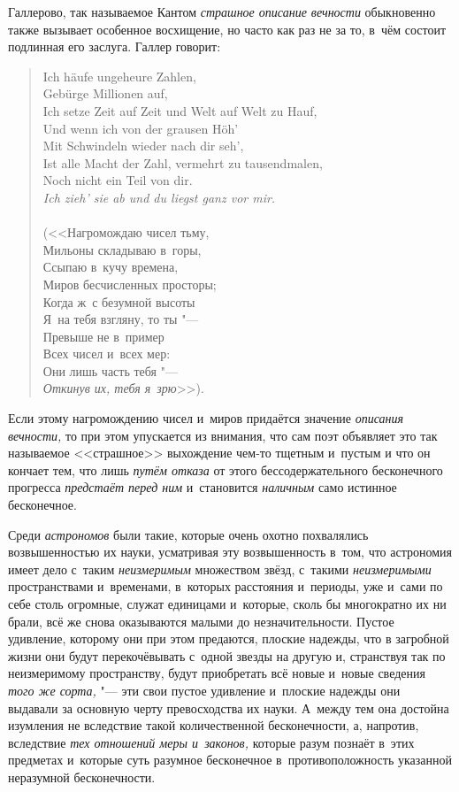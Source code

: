 Галлерово, так называемое Кантом {\em страшное описание вечности} обыкновенно
также вызывает особенное восхищение, но часто как раз не за то, в~чём состоит
подлинная его заслуга. Галлер говорит:

\begin{verse}{\footnotesize
Ich häufe ungeheure Zahlen, \\
Gebürge Millionen auf, \\
Ich setze Zeit auf Zeit und Welt auf Welt zu Hauf, \\
Und wenn ich von der grausen Höh' \\
Mit Schwindeln wieder nach dir seh', \\
Ist alle Macht der Zahl, vermehrt zu tausendmalen, \\
Noch nicht ein Teil von dir. \\
{\em Ich zieh' sie ab und du liegst ganz vor mir.} \\
\ \\}
(<<Нагромождаю чисел тьму, \\
Мильоны складываю в~горы, \\
Ссыпаю в~кучу времена, \\
Миров бесчисленных просторы; \\
Когда ж~с безумной высоты \\
Я~на тебя взгляну, то ты "--- \\
Превыше не в~пример \\
Всех чисел и~всех мер: \\
Они лишь часть тебя "--- \\
{\em Откинув их, тебя я~зрю}>>).
\end{verse}

Если этому нагромождению чисел и~миров придаётся значение
{\em описания вечности,} то при этом упускается из внимания, что сам поэт
объявляет это так называемое <<страшное>> выхождение чем-то тщетным и~пустым и
что он кончает тем, что лишь {\em путём отказа} от этого бессодержательного
бесконечного прогресса {\em предстаёт перед ним} и~становится {\em наличным}
само истинное бесконечное.

Среди {\em астрономов} были такие, которые очень охотно похвалялись
возвышенностью их науки, усматривая эту возвышенность в~том, что астрономия
имеет дело с~таким {\em неизмеримым} множеством звёзд, с~такими
{\em неизмеримыми} пространствами и~временами, в~которых расстояния и~периоды,
уже и~сами по себе столь огромные, служат единицами и~которые, сколь бы
многократно их ни брали, всё же снова оказываются малыми до незначительности.
Пустое удивление, которому они при этом предаются, плоские надежды, что в
загробной жизни они будут перекочёвывать с~одной звезды на другую и, странствуя
так по неизмеримому пространству, будут приобретать всё новые и~новые сведения
{\em того же сорта,} "--- эти свои пустое удивление и~плоские надежды они
выдавали за основную черту превосходства их науки. А~между тем она достойна
изумления не вследствие такой количественной бесконечности, а, напротив,
вследствие {\em тех отношений меры и~законов,} которые разум познаёт в~этих
предметах и~которые суть разумное бесконечное в~противоположность указанной
неразумной бесконечности.


